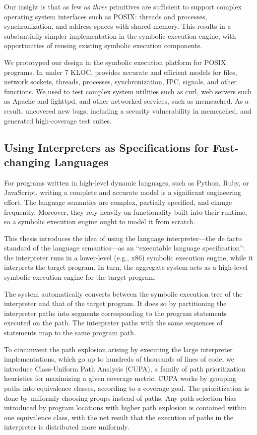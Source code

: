 Our insight is that as few as \emph{three} primitives are sufficient to support complex operating system interfaces such as POSIX: threads and processes, synchronization, and address spaces with shared memory.
%
This results in a substantially simpler implementation in the symbolic execution engine, with opportunities of reusing existing symbolic execution components.

We prototyped our design in the \emph{\cnine} symbolic execution platform for POSIX programs.  In under 7 KLOC, \cnine provides accurate and efficient models for files, network sockets, threads, processes, synchronization, IPC, signals, and other functions.
%
We used \cnine to test complex system utilities such as \textsf{curl}, web servers such as Apache and lighttpd, and other networked services, such as memcached.
%
As a result, \cnine uncovered new bugs, including a security vulnerability in memcached, and generated high-coverage test suites.


\subsection{Using Interpreters as Specifications for Fast-changing Languages}

For programs written in high-level dynamic languages, such as Python, Ruby, or JavaScript, writing a complete and accurate model is a significant engineering effort.
%
The language semantics are complex, partially specified, and change frequently.  Moreover, they rely heavily on functionality built into their runtime, so a symbolic execution engine ought to model it from scratch.

This thesis introduces the idea of using the language interpreter---the de facto standard of the language semantics---as an ``executable language specification'': the interpreter runs in a lower-level (e.g., x86) symbolic execution engine, while it interprets the target program.  In turn, the aggregate system acts as a high-level symbolic execution engine for the target program.

The system automatically converts between the symbolic execution tree of the interpreter and that of the target program.
%
It does so by partitioning the interpreter paths into segments corresponding to the program statements executed on the path.  The interpreter paths with the same sequences of statements map to the same program path.

To circumvent the path explosion arising by executing the large interpreter implementations, which go up to hundreds of thousands of lines of code, we introduce Class-Uniform Path Analysis (CUPA), a family of path prioritization heuristics for maximizing a given coverage metric.
%
CUPA works by grouping paths into equivalence classes, according to a coverage goal.  The prioritization is done by uniformly choosing groups instead of paths.  Any path selection bias introduced by program locations with higher path explosion is contained within one equivalence class, with the net result that the execution of paths in the interpreter is distributed more uniformly.

